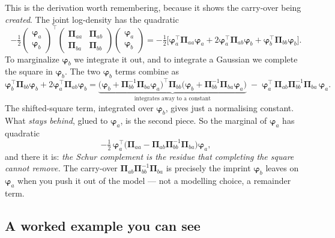 \documentclass[11pt]{article}
\newcommand{\Prec}{\bm{\Pi}}        %
\newcommand{\fvec}{\bm{\varphi}}    %
\theoremstyle{definition}
\begin{document}
This is the derivation worth remembering, because it shows the carry-over
being \emph{created}. The joint log-density has the quadratic
\begin{equation}
-\tfrac12
\begin{pmatrix}\fvec_a\\\fvec_b\end{pmatrix}^{\!\top}\!
\begin{pmatrix}\Prec_{aa}&\Prec_{ab}\\\Prec_{ba}&\Prec_{bb}\end{pmatrix}\!
\begin{pmatrix}\fvec_a\\\fvec_b\end{pmatrix}
=-\tfrac12\Big[\fvec_a^{\top}\Prec_{aa}\fvec_a
+2\fvec_a^{\top}\Prec_{ab}\fvec_b
+\fvec_b^{\top}\Prec_{bb}\fvec_b\Big].
\end{equation}
To marginalize $\fvec_b$ we integrate it out, and to integrate a Gaussian
we complete the square in $\fvec_b$. The two $\fvec_b$ terms combine as
\begin{equation}
\fvec_b^{\top}\Prec_{bb}\fvec_b+2\fvec_a^{\top}\Prec_{ab}\fvec_b
=\underbrace{\big(\fvec_b+\Prec_{bb}^{-1}\Prec_{ba}\fvec_a\big)^{\!\top}
\Prec_{bb}\big(\fvec_b+\Prec_{bb}^{-1}\Prec_{ba}\fvec_a\big)}_{\text{integrates away to a constant}}
\;-\;\fvec_a^{\top}\,\Prec_{ab}\Prec_{bb}^{-1}\Prec_{ba}\,\fvec_a.
\end{equation}
The shifted-square term, integrated over $\fvec_b$, gives just a
normalising constant. What \emph{stays behind}, glued to $\fvec_a$, is the
second piece. So the marginal of $\fvec_a$ has quadratic
\begin{equation}
-\tfrac12\,\fvec_a^{\top}\big(\Prec_{aa}-\Prec_{ab}\Prec_{bb}^{-1}\Prec_{ba}\big)\fvec_a,
\end{equation}
and there it is: \emph{the Schur complement is the residue that completing
the square cannot remove.} The carry-over $\Prec_{ab}\Prec_{bb}^{-1}\Prec_{ba}$
is precisely the imprint $\fvec_b$ leaves on $\fvec_a$ when you push it out
of the model --- not a modelling choice, a remainder term.

\subsection{A worked example you can see}
\end{document}
